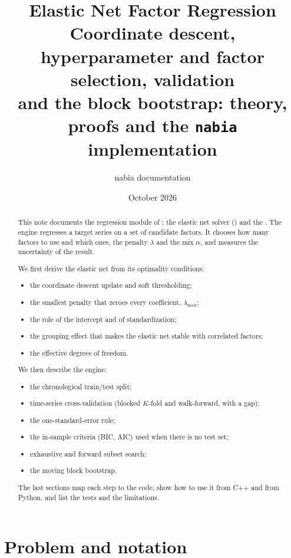 \documentclass[11pt,a4paper]{article}
\title{Elastic Net Factor Regression\\[0.3em]\large Coordinate descent, hyperparameter and factor selection, validation\\
and the block bootstrap: theory, proofs and the \texttt{nabia} implementation}
\author{nabia documentation}
\date{October 2026}
\begin{document}
\maketitle

\begin{abstract}
This note documents the regression module of : the elastic net solver
() and the . The engine regresses a target series on a set of candidate factors.
It chooses how many factors to use and which ones, the penalty $\lambda$ and the mix
$\alpha$, and measures the uncertainty of the result.

We first derive the elastic net from its optimality conditions:
\begin{itemize}
  \item the coordinate descent update and soft thresholding;
  \item the smallest penalty that zeroes every coefficient, $\lambda_{\max}$;
  \item the role of the intercept and of standardization;
  \item the grouping effect that makes the elastic net stable with correlated factors;
  \item the effective degrees of freedom.
\end{itemize}
We then describe the engine:
\begin{itemize}
  \item the chronological train/test split;
  \item time-series cross-validation (blocked $K$-fold and walk-forward, with a gap);
  \item the one-standard-error rule;
  \item the in-sample criteria (BIC, AIC) used when there is no test set;
  \item exhaustive and forward subset search;
  \item the moving block bootstrap.
\end{itemize}
The last sections map each step to the code, show how to use it from C++ and from Python,
and list the tests and the limitations.
\end{abstract}

\tableofcontents

\section{Problem and notation}
\end{document}
